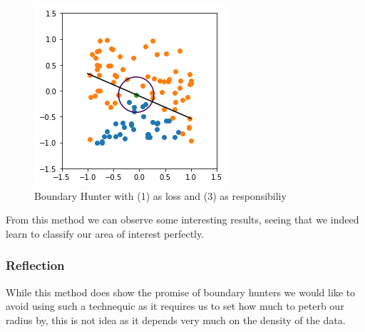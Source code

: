 \documentclass{article}
\begin{document}
\begin{figure}[H]
\centering
  \begin{minipage}[b]{0.4\textwidth}
    \includegraphics[width=\textwidth]{BoundaryHunter-Attempt3-01.png}
    \caption{Boundary Hunter with (1) as loss and (3) as responsibiliy}
  \end{minipage}
  \hfill
\end{figure}

From this method we can observe some interesting results, seeing that we indeed learn to classify our area of interest perfectly.

\subsubsection{Reflection}
While this method does show the promise of boundary hunters we would like to avoid using such a technequic as it requires us to set how much to peterb our radius by, this is not idea as it depends very much on the density of the data.
\end{document}
